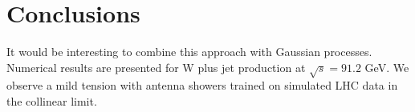 \section{Conclusions}\label{sec:conclusions}

It would be interesting to combine this approach with Gaussian
processes. Numerical results are presented for W plus jet production at
$\sqrt{s} = 91.2$ GeV. We observe a mild tension with antenna showers
trained on simulated LHC data in the collinear limit.


